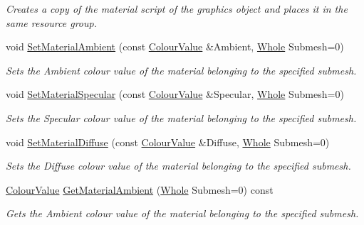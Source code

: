 \begin{DoxyCompactItemize}
\begin{DoxyCompactList}\small\item\em Creates a copy of the material script of the graphics object and places it in the same resource group. \item\end{DoxyCompactList}\item 
void \hyperlink{classphys_1_1ActorGraphicsSettings_a93d1c9b229b51b98702b29b8bb5ec4d0}{SetMaterialAmbient} (const \hyperlink{classphys_1_1ColourValue}{ColourValue} \&Ambient, \hyperlink{namespacephys_a460f6bc24c8dd347b05e0366ae34f34a}{Whole} Submesh=0)
\begin{DoxyCompactList}\small\item\em Sets the Ambient colour value of the material belonging to the specified submesh. \item\end{DoxyCompactList}\item 
void \hyperlink{classphys_1_1ActorGraphicsSettings_a51bfae72380679093595c1805b1d940b}{SetMaterialSpecular} (const \hyperlink{classphys_1_1ColourValue}{ColourValue} \&Specular, \hyperlink{namespacephys_a460f6bc24c8dd347b05e0366ae34f34a}{Whole} Submesh=0)
\begin{DoxyCompactList}\small\item\em Sets the Specular colour value of the material belonging to the specified submesh. \item\end{DoxyCompactList}\item 
void \hyperlink{classphys_1_1ActorGraphicsSettings_a135bebcafc6a2386aaec61bce7a5e548}{SetMaterialDiffuse} (const \hyperlink{classphys_1_1ColourValue}{ColourValue} \&Diffuse, \hyperlink{namespacephys_a460f6bc24c8dd347b05e0366ae34f34a}{Whole} Submesh=0)
\begin{DoxyCompactList}\small\item\em Sets the Diffuse colour value of the material belonging to the specified submesh. \item\end{DoxyCompactList}\item 
\hyperlink{classphys_1_1ColourValue}{ColourValue} \hyperlink{classphys_1_1ActorGraphicsSettings_a7cebcdcf70ffedf15ece92c1326a95c3}{GetMaterialAmbient} (\hyperlink{namespacephys_a460f6bc24c8dd347b05e0366ae34f34a}{Whole} Submesh=0) const 
\begin{DoxyCompactList}\small\item\em Gets the Ambient colour value of the material belonging to the specified submesh. \item\end{DoxyCompactList}\item 

\end{DoxyCompactItemize}
